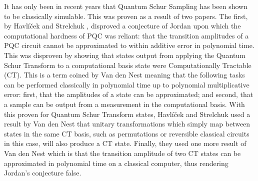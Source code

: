 It has only been in recent years that Quantum Schur Sampling has been shown to be classically simulable. This was proven as a result of two papers. The first, by Havl\'{i}\v{c}ek and Strelchuk \cite{havlicek2018}, disproved a conjecture of Jordan upon which the computational hardness of PQC was reliant: that the transition amplitudes of a PQC circuit cannot be approximated to within additive error in polynomial time. This was disproven by showing that states output from applying the Quantum Schur Transform to a computational basis state were Computationally Tractable (CT). This is a term coined by Van den Nest \cite{vandennest2011} meaning that the following tasks can be performed classically in polynomial time up to polynomial multiplicative error: first, that the amplitudes of a state can be approximated; and second, that a sample can be output from a measurement in the computational basis. With this proven for Quantum Schur Transform states, Havl\'{i}\v{c}ek and Strelchuk used a result by Van den Nest that unitary transformations which simply map between states in the same CT basis, such as permutations or reversible classical circuits in this case, will also produce a CT state. Finally, they used one more result of Van den Nest which is that the transition amplitude of two CT states can be approximated in polynomial time on a classical computer, thus rendering Jordan's conjecture false.

